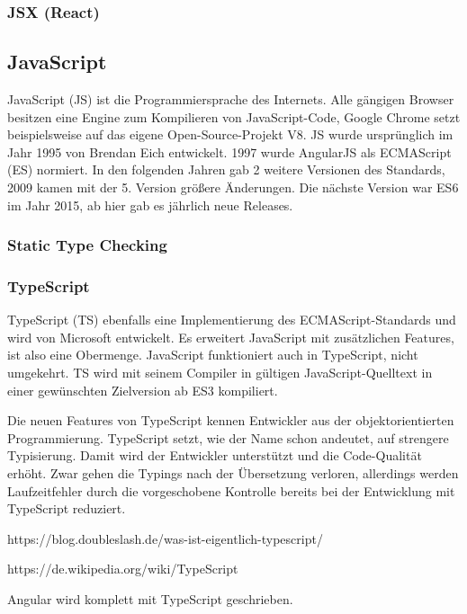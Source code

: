 \subsubsection{JSX (React)}


\subsection{JavaScript}
JavaScript (JS) ist die Programmiersprache des Internets. Alle gängigen Browser besitzen eine Engine zum Kompilieren von JavaScript-Code, Google Chrome setzt beispielsweise auf das eigene Open-Source-Projekt V8. JS wurde ursprünglich im Jahr 1995 von Brendan Eich entwickelt. 1997 wurde AngularJS als ECMAScript (ES) normiert. In den folgenden Jahren gab 2 weitere Versionen des Standards, 2009 kamen mit der 5. Version größere Änderungen. Die nächste Version war ES6 im Jahr 2015, ab hier gab es jährlich neue Releases.


\subsubsection{Static Type Checking}

\subsubsection{TypeScript}
TypeScript (TS) ebenfalls eine Implementierung des ECMAScript-Standards und wird von Microsoft entwickelt. Es erweitert JavaScript mit zusätzlichen Features, ist also eine Obermenge. JavaScript funktioniert auch in TypeScript, nicht umgekehrt. TS wird mit seinem Compiler in gültigen JavaScript-Quelltext in einer gewünschten Zielversion ab ES3 kompiliert. 

Die neuen Features von TypeScript kennen Entwickler aus der objektorientierten Programmierung. TypeScript setzt, wie der Name schon andeutet, auf strengere Typisierung.
Damit wird der Entwickler unterstützt und die Code-Qualität erhöht. Zwar gehen die Typings nach der Übersetzung verloren, allerdings werden Laufzeitfehler durch die vorgeschobene Kontrolle bereits bei der Entwicklung mit TypeScript reduziert.

https://blog.doubleslash.de/was-ist-eigentlich-typescript/

https://de.wikipedia.org/wiki/TypeScript

Angular wird komplett mit TypeScript geschrieben. 


